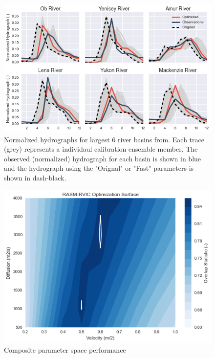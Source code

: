 \documentclass[jgrga, draft]{agutex}
\begin{document}
\clearpage
\begin{figure}
\noindent\includegraphics[width=40pc,natwidth=1]{Figure_3}
\caption{Normalized hydrographs for largest 6 river basins from.  Each trace (grey) represents a individaul calibration ensemble member. The observed (normalized) hydrograph for each basin is shown in blue and the hydrograph using the "Orignal" or "Fast" parameters is shown in dash-black.}
\label{fig:3}
\end{figure}

\clearpage
\begin{figure}
\noindent\includegraphics[width=40pc,natwidth=1]{Figure_4}
\caption{Composite parameter space performance}
\label{fig:4}
\end{figure}
\end{document}
